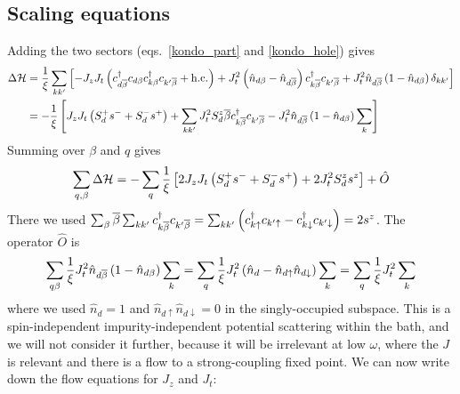 \documentclass[12pt,twoside]{report}
\numberwithin{equation}{section}
\begin{document}
\subsection{Scaling equations}
Adding the two sectors (eqs.~\ref{kondo_part} and \ref{kondo_hole}) gives
\begin{equation}\begin{aligned}
	\Delta \mathcal{H} &= \frac{1}{\xi}\sum_{kk^\prime} \left[ - J_z J_t\left(c^\dagger_{d\overline\beta}c_{d\beta}c^\dagger_{k\beta}c_{k^\prime\overline\beta} + \text{h.c.}\right) + J_t^2 \left(\hat n_{d\beta} - \hat n_{d\overline\beta}\right) c^\dagger_{k\overline\beta}c_{k^\prime\overline\beta} + J_t^2 \hat n_{d\overline\beta}\left(1 - \hat n_{d\beta}\right) \delta_{kk^\prime}\right]\\
		    &= -\frac{1}{\xi}\left[ J_z J_t\left(S_d^+ s^- + S_d^- s^+\right) + \sum_{kk^\prime} J_t^2 S_d^z \overline\beta c^\dagger_{k\overline\beta}c_{k^\prime\overline\beta} - J_t^2 \hat n_{d\overline\beta}\left(1 - \hat n_{d\beta}\right) \sum_{k} \right]\\
\end{aligned}\end{equation}
Summing over \(\beta\) and \(q\) gives
\begin{equation}\begin{aligned}
	\sum_{q,\beta} \Delta \mathcal{H} = - \sum_q \frac{1}{\xi} \left[2J_z J_t \left( S_d^+ s^- + S_d^- s^+ \right) + 2J_t^2 S_d^z s^z\right] + \hat O
\end{aligned}\end{equation}
There we used \(\sum_\beta \overline\beta \sum_{kk^\prime}c^\dagger_{k\overline\beta}c_{k^\prime\overline\beta} = \sum_{kk^\prime}\left(c^\dagger_{k\uparrow}c_{k^\prime\uparrow} - c^\dagger_{k\downarrow}c_{k^\prime\downarrow}\right)  = 2s^z\). The operator \(\hat O\) is
\begin{equation}\begin{aligned}
	\sum_{q\beta} \frac{1}{\xi} J_t^2 \hat n_{d\overline\beta}\left(1 - \hat n_{d\beta}\right) \sum_{k} = \sum_q \frac{1}{\xi} J_t^2 \left(\hat n_d - \hat n_{d \uparrow} \hat n_{d \downarrow}\right) \sum_k = \sum_q\frac{1}{\xi} J_t^2 \sum_k
\end{aligned}\end{equation}
where we used \(\hat n_d = 1\) and \(\hat n_{d \uparrow} \hat n_{d \downarrow} = 0\) in the singly-occupied subspace. This is a spin-independent impurity-independent potential scattering  within the bath, and we will not consider it further, because it will be irrelevant at low \(\omega\), where the \(J\) is relevant and there is a flow to a strong-coupling fixed point.
\pb We can now write down the flow equations for \(J_z\) and \(J_t\):
\end{document}
